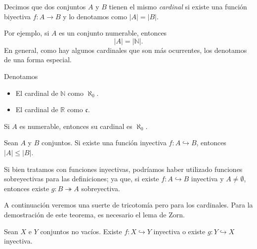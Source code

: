 \begin{definition}
	Decimos que dos conjuntos $A$ y $B$ tienen el mismo \emph{cardinal} si existe una función biyectiva $f: A \to  B$ y lo denotamos como $\lvert A \rvert = \lvert B \rvert$.
\end{definition}

Por ejemplo, si $A$ es un conjunto numerable, entonces
$$
	\lvert A \rvert = \lvert \mathbb{N} \rvert.
$$
En general, como hay algunos cardinales que son más ocurrentes, los denotamos de una forma especial.

\begin{definition}
	Denotamos
	\begin{itemize}
		\item El cardinal de $\mathbb{N}$ como $\aleph_0$.
		\item El cardinal de $\mathbb{R}$ como $\mathfrak{c}$.
	\end{itemize}
\end{definition}

\begin{remark}
	Si $A$ es numerable, entonces su cardinal es $\aleph_0$.
\end{remark}

\begin{definition}
	Sean $A$ y $B$ conjuntos. Si existe una función inyectiva $f: A \hookrightarrow B$, entonces $\lvert A \rvert \leq \lvert B \rvert$.
\end{definition}

Si bien tratamos con funciones inyectivas, podríamos haber utilizado funciones sobreyectivas para las definiciones; ya que, si existe $f: A \hookrightarrow B$ inyectiva y $A \neq \emptyset $, entonces existe $g: B \twoheadrightarrow A$ sobreyectiva.

A continuación veremos una suerte de tricotomía pero para los cardinales. Para la demostración de este teorema, es necesario el lema de Zorn.

\begin{theorem}
	Sean $X$ e $Y$ conjuntos no vacíos. Existe $f: X \hookrightarrow Y$ inyectiva o existe $g: Y \hookrightarrow X$ inyectiva.
\end{theorem}

